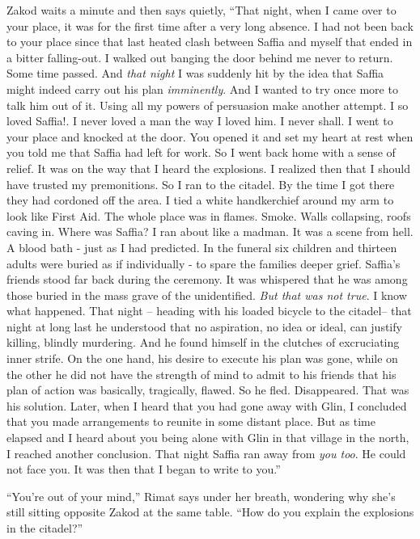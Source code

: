 \documentclass[twoside,11pt]{book}
\begin{document}
Zakod waits a minute and then says quietly, ``That night, when I came over to your place,
it was for the first time after a very long absence. I had not been back to
your place since that last heated clash between Saffia and myself that ended in a bitter falling-out. I walked out
banging the door behind me never to return.  Some time passed. And \textit{that night} I was suddenly hit by the idea
that Saffia might indeed carry out his plan \textit{imminently}. And I wanted to try once more to talk him out of it.
Using all my powers of persuasion make another attempt. I so loved Saffia!. I never loved a man the way I loved him. I
never shall. I went to your place and knocked at the door. You opened it and set my heart at rest when you told me that
Saffia had left for work. So I went back home with a sense of relief. It was on the way that I heard the explosions.
I realized then that I should have trusted my premonitions. So I ran to the citadel. By the time I got there they had
cordoned off the area. I tied a white handkerchief around my arm to look like First Aid. The whole place was in flames.
Smoke. Walls collapsing, roofs caving in. Where was Saffia? I ran about like a madman. It was a scene from hell. A
blood bath - just as I had predicted. In the funeral six children and thirteen adults were buried as if individually -
to spare the families deeper grief. Saffia's friends stood far back during the ceremony. It was whispered that he was
among those buried in the mass grave of the unidentified. \textit{But that was  not true}. I know what happened. That
night -- heading with his loaded bicycle to the citadel-- that night at long last he understood that no aspiration, no
idea or ideal, can justify killing, blindly murdering. And he found himself in the clutches of excruciating inner
strife. On the one hand, his desire to execute his plan was gone, while on the other he did not have the strength of
mind to admit to his friends that his plan of action was basically, tragically, flawed. So he fled. Disappeared. That
was his solution. Later, when I heard that you had gone away with Glin, I concluded that you made arrangements to
reunite in some distant place. But as time elapsed and I heard about you being alone with Glin in that village in the
north, I reached another conclusion. That night Saffia ran away from \textit{you too}. He could not face you. It was
then that I began to write to you.''

``You're out of your mind,'' Rimat says under her breath, wondering why she's still sitting
opposite Zakod at the same table. ``How do you explain the explosions in the citadel?''
\end{document}
